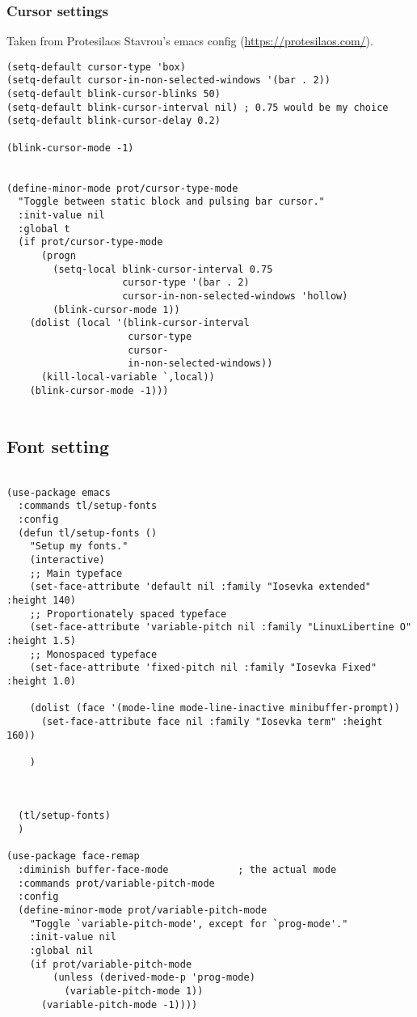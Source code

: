 \documentclass[12pt]{article}
\begin{document}
\subsubsection{Cursor settings}
\label{sec:orgd1ff701}

Taken from Protesilaos Stavrou's emacs config (\url{https://protesilaos.com/}).

\begin{verbatim}
(setq-default cursor-type 'box)
(setq-default cursor-in-non-selected-windows '(bar . 2))
(setq-default blink-cursor-blinks 50)
(setq-default blink-cursor-interval nil) ; 0.75 would be my choice
(setq-default blink-cursor-delay 0.2)

(blink-cursor-mode -1)


(define-minor-mode prot/cursor-type-mode
  "Toggle between static block and pulsing bar cursor."
  :init-value nil
  :global t
  (if prot/cursor-type-mode
      (progn
        (setq-local blink-cursor-interval 0.75
                    cursor-type '(bar . 2)
                    cursor-in-non-selected-windows 'hollow)
        (blink-cursor-mode 1))
    (dolist (local '(blink-cursor-interval
                     cursor-type
                     cursor-
                     in-non-selected-windows))
      (kill-local-variable `,local))
    (blink-cursor-mode -1)))


\end{verbatim}

\subsection{Font setting}
\label{sec:orgac389e6}

\begin{verbatim}

(use-package emacs
  :commands tl/setup-fonts
  :config
  (defun tl/setup-fonts ()
    "Setup my fonts."
    (interactive)
    ;; Main typeface
    (set-face-attribute 'default nil :family "Iosevka extended" :height 140)
    ;; Proportionately spaced typeface
    (set-face-attribute 'variable-pitch nil :family "LinuxLibertine O" :height 1.5)
    ;; Monospaced typeface
    (set-face-attribute 'fixed-pitch nil :family "Iosevka Fixed" :height 1.0)

    (dolist (face '(mode-line mode-line-inactive minibuffer-prompt))
      (set-face-attribute face nil :family "Iosevka term" :height 160))

    )



  (tl/setup-fonts)
  )

(use-package face-remap
  :diminish buffer-face-mode            ; the actual mode
  :commands prot/variable-pitch-mode
  :config
  (define-minor-mode prot/variable-pitch-mode
    "Toggle `variable-pitch-mode', except for `prog-mode'."
    :init-value nil
    :global nil
    (if prot/variable-pitch-mode
        (unless (derived-mode-p 'prog-mode)
          (variable-pitch-mode 1))
      (variable-pitch-mode -1))))

\end{verbatim}
\end{document}
